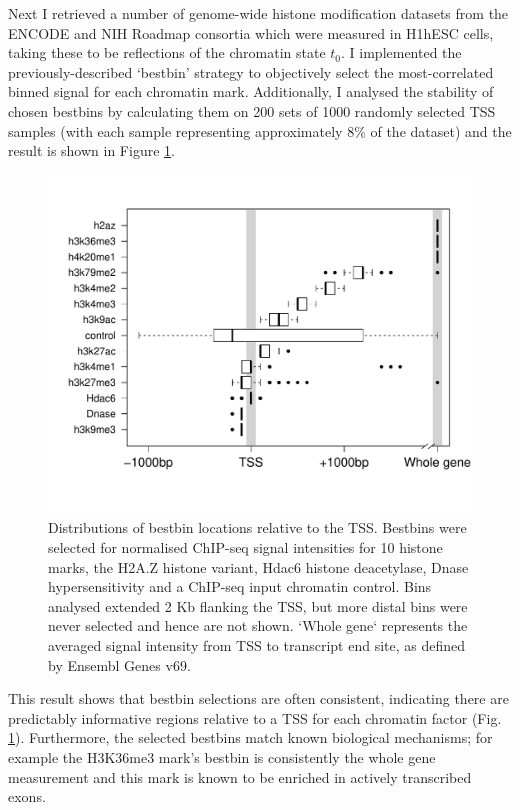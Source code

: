 \documentclass[a4paper]{report}
\begin{document}
Next I retrieved a number of genome-wide histone modification datasets
from the ENCODE and
NIH Roadmap consortia which were measured in H1hESC cells, taking these to be
reflections of the chromatin state $t_0$. I implemented the
previously-described `bestbin' strategy\cite{Dong2012} to objectively
select the most-correlated binned signal for each chromatin
mark. Additionally, I analysed the stability of chosen bestbins by
calculating them on 200 sets of 1000 randomly selected TSS samples (with each sample
representing approximately $8\%$ of the dataset) and the result is
shown in Figure \ref{fig:bestbin}. \\

\begin{figure}[t]
\begin{center} 
\includegraphics[width=.9\textwidth]{figs/bestbinSummary.pdf}
\captionsetup{width=.9\textwidth} \vspace{-14pt}
\caption{Distributions of bestbin locations relative to the
  TSS. Bestbins were selected for normalised ChIP-seq
  signal intensities for 10 histone marks, the
  H2A.Z histone variant, Hdac6 histone deacetylase, Dnase
  hypersensitivity and a ChIP-seq input chromatin control. Bins analysed
  extended 2 Kb flanking the TSS, but more distal bins were
  never selected and hence are not shown. `Whole gene` represents the
  averaged signal intensity from TSS to transcript end site, as
  defined by Ensembl Genes v69.
}\label{fig:bestbin}
\end{center}
\end{figure} 
This result shows that bestbin selections are often consistent, indicating there are predictably informative regions
relative to a TSS for each chromatin factor (Fig. \ref{fig:bestbin}). Furthermore, the selected
bestbins match known biological mechanisms; for example the H3K36me3
mark's bestbin is consistently the whole gene measurement and this
mark is known to be enriched in actively transcribed
exons.\cite{Tippmann2012, Kolasinska-Zwierz2009, Schaft2003} \\
\end{document}
